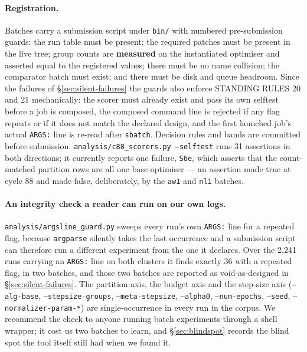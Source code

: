 \documentclass[10pt,letterpaper]{article}
\newcommand{\arm}[1]{\texttt{#1}}
\begin{document}
\paragraph{Registration.}
Batches carry a submission script under \texttt{bin/} with numbered pre-submission guards: the run
table must be present; the required patches must be present in the live tree; group counts are
\textbf{measured} on the instantiated optimiser and asserted equal to the registered values; there
must be no name collision; the comparator batch must exist; and there must be disk and queue
headroom. Since the failures of \S\ref{sec:silent-failures} the guards also enforce STANDING RULES
20 and 21 mechanically: the scorer must already exist and pass its own selftest before a job is
composed, the composed command line is rejected if any flag repeats or if it does not match the
declared design, and the first launched job's actual \texttt{ARGS:} line is re-read after
\texttt{sbatch}. Decision rules and bands are committed before submission.
\texttt{analysis/c88\_scorers.py --selftest} runs 31 assertions in both directions; it currently
reports one failure, \texttt{S6e}, which asserts that the count-matched partition rows are all one
base optimiser --- an assertion made true at cycle 88 and made false, deliberately, by the
\arm{aw1} and \arm{nl1} batches.

\paragraph{An integrity check a reader can run on our own logs.}
\texttt{analysis/argsline\_guard.py} sweeps every run's own \texttt{ARGS:} line for a repeated
flag, because \texttt{argparse} silently takes the last occurrence and a submission script can
therefore run a different experiment from the one it declares. Over the 2{,}241 runs carrying an
\texttt{ARGS:} line on both clusters it finds exactly 36 with a repeated flag, in two batches, and
those two batches are reported as void-as-designed in \S\ref{sec:silent-failures}. The partition
axis, the budget axis and the step-size axis (\texttt{--alg-base}, \texttt{--stepsize-groups},
\texttt{--meta-stepsize}, \texttt{--alpha0}, \texttt{--num-epochs}, \texttt{--seed},
\texttt{--normalizer-param-*}) are single-occurrence in every run in the corpus. We recommend the
check to anyone running batch experiments through a shell wrapper; it cost us two batches to learn,
and \S\ref{sec:blindspot} records the blind spot the tool itself still had when we found it.
\end{document}
